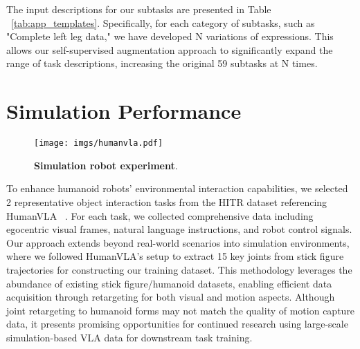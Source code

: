 

The input descriptions for our subtasks are presented in Table ~\ref{tab:app_templates}. Specifically, for each category of subtasks, such as "Complete left leg data," we have developed N variations of expressions. This allows our self-supervised augmentation approach to significantly expand the range of task descriptions, increasing the original 59 subtasks at N times.




\section{Simulation Performance}

\begin{figure*}[h]
  \centering
   \texttt{[image: imgs/humanvla.pdf]}
   \caption{\textbf{Simulation robot experiment}.}
   \label{fig:humanvla}
\end{figure*}


To enhance humanoid robots' environmental interaction capabilities, we selected 2 representative object interaction tasks from the HITR dataset referencing HumanVLA ~\cite{xu2024humanvla}. For each task, we collected comprehensive data including egocentric visual frames, natural language instructions, and robot control signals. Our approach extends beyond real-world scenarios into simulation environments, where we followed HumanVLA's setup to extract 15 key joints from stick figure trajectories for constructing our training dataset. This methodology leverages the abundance of existing stick figure/humanoid datasets, enabling efficient data acquisition through retargeting for both visual and motion aspects. Although joint retargeting to humanoid forms may not match the quality of motion capture data, it presents promising opportunities for continued research using large-scale simulation-based VLA data for downstream task training.

